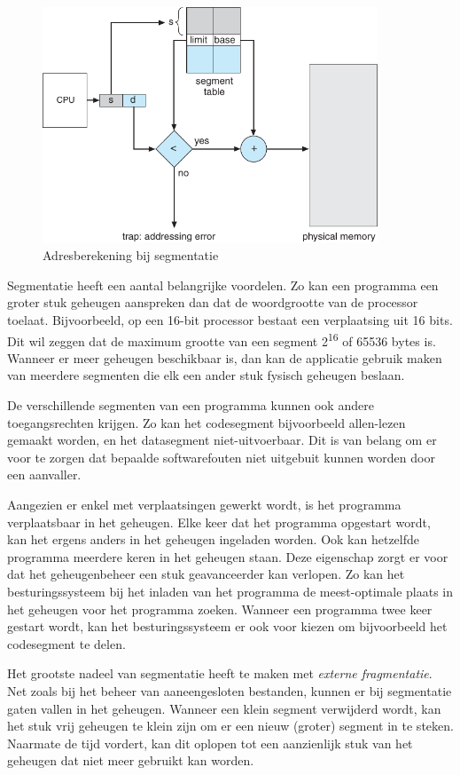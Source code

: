 \begin{figure}
\begin{center}
\includegraphics[width=100mm]{images/segmentatie.pdf}
\end{center}
\caption{Adresberekening bij segmentatie}
\label{segmentatie}
\end{figure}

Segmentatie heeft een aantal belangrijke voordelen. Zo kan een programma een groter stuk geheugen aanspreken dan dat de woordgrootte van de processor toelaat. Bijvoorbeeld, op een 16-bit processor bestaat een verplaatsing uit 16 bits. Dit wil zeggen dat de maximum grootte van een segment 2\textsuperscript{16} of 65536 bytes is. Wanneer er meer geheugen beschikbaar is, dan kan de applicatie gebruik maken van meerdere segmenten die elk een ander stuk fysisch geheugen beslaan.

De verschillende segmenten van een programma kunnen ook andere toegangsrechten krijgen. Zo kan het codesegment bijvoorbeeld allen-lezen gemaakt worden, en het datasegment niet-uitvoerbaar. Dit is van belang om er voor te zorgen dat bepaalde softwarefouten niet uitgebuit kunnen worden door een aanvaller.

Aangezien er enkel met verplaatsingen gewerkt wordt, is het programma verplaatsbaar in het geheugen. Elke keer dat het programma opgestart wordt, kan het ergens anders in het geheugen ingeladen worden. Ook kan hetzelfde programma meerdere keren in het geheugen staan. Deze eigenschap zorgt er voor dat het geheugenbeheer een stuk geavanceerder kan verlopen. Zo kan het besturingssysteem bij het inladen van het programma de meest-optimale plaats in het geheugen voor het programma zoeken. Wanneer een programma twee keer gestart wordt, kan het besturingssysteem er ook voor kiezen om bijvoorbeeld het codesegment te delen.

Het grootste nadeel van segmentatie heeft te maken met \emph{externe fragmentatie}. Net zoals bij het beheer van aaneengesloten bestanden, kunnen er bij segmentatie gaten vallen in het geheugen. Wanneer een klein segment verwijderd wordt, kan het stuk vrij geheugen te klein zijn om er een nieuw (groter) segment in te steken. Naarmate de tijd vordert, kan dit oplopen tot een aanzienlijk stuk van het geheugen dat niet meer gebruikt kan worden.

